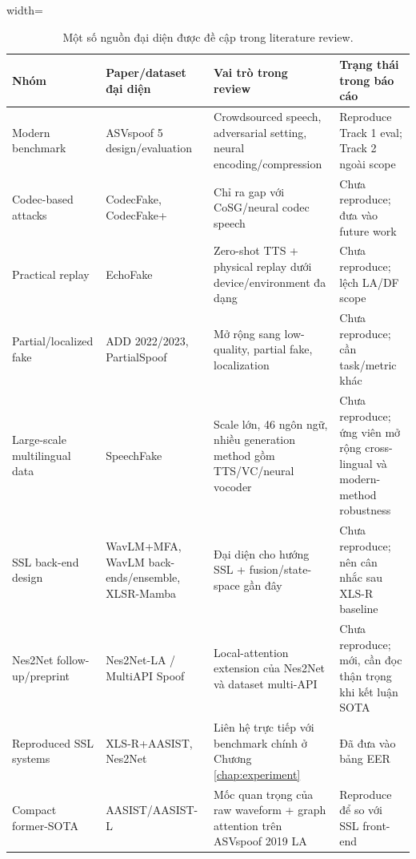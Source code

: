 \begin{table}[H]
    \centering
    \footnotesize
    \begin{adjustbox}{width=\textwidth}
    \begin{tabular}{p{3.0cm}|p{4.0cm}|p{5.0cm}|p{4.0cm}}
        \textbf{Nhóm} & \textbf{Paper/dataset đại diện} & \textbf{Vai trò trong review} & \textbf{Trạng thái trong báo cáo}
        \\ \hline
        Modern benchmark & ASVspoof 5 design/evaluation \cite{asvspoof5_design,asvspoof5_eval} & Crowdsourced speech, adversarial setting, neural encoding/compression & Reproduce Track 1 eval; Track 2 ngoài scope
        \\ \hline
        Codec-based attacks & CodecFake, CodecFake+ \cite{codecfake,codecfakeplus} & Chỉ ra gap với CoSG/neural codec speech & Chưa reproduce; đưa vào future work
        \\ \hline
        Practical replay & EchoFake \cite{echofake} & Zero-shot TTS + physical replay dưới device/environment đa dạng & Chưa reproduce; lệch LA/DF scope
        \\ \hline
        Partial/localized fake & ADD 2022/2023, PartialSpoof \cite{add2022,add2023,partialspoof} & Mở rộng sang low-quality, partial fake, localization & Chưa reproduce; cần task/metric khác
        \\ \hline
        Large-scale multilingual data & SpeechFake \cite{speechfake} & Scale lớn, 46 ngôn ngữ, nhiều generation method gồm TTS/VC/neural vocoder & Chưa reproduce; ứng viên mở rộng cross-lingual và modern-method robustness
        \\ \hline
        SSL back-end design & WavLM+MFA, WavLM back-ends/ensemble, XLSR-Mamba \cite{wavlm_mfa,wavlm_backend,wavlm_ensemble,xlsr_mamba} & Đại diện cho hướng SSL + fusion/state-space gần đây & Chưa reproduce; nên cân nhắc sau XLS-R baseline
        \\ \hline
        Nes2Net follow-up/preprint & Nes2Net-LA / MultiAPI Spoof \cite{multiapi_spoof} & Local-attention extension của Nes2Net và dataset multi-API & Chưa reproduce; mới, cần đọc thận trọng khi kết luận SOTA
        \\ \hline
        Reproduced SSL systems & XLS-R+AASIST, Nes2Net \cite{ssl_aasist,nes2net} & Liên hệ trực tiếp với benchmark chính ở Chương \ref{chap:experiment} & Đã đưa vào bảng EER
        \\ \hline
        Compact former-SOTA & AASIST/AASIST-L \cite{aasist} & Mốc quan trọng của raw waveform + graph attention trên ASVspoof 2019 LA & Reproduce để so với SSL front-end
    \end{tabular}
    \end{adjustbox}
    \caption{Một số nguồn đại diện được đề cập trong literature review.}
    \label{tab:literature-sources}
\end{table}

